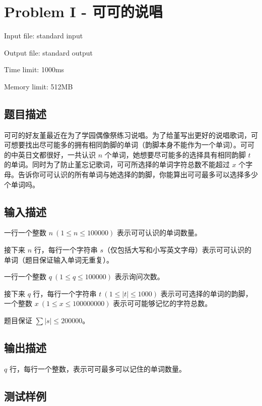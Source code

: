 \newpage
\section{Problem I - 可可的说唱}
{ \limitfont{}
Input file: standard input \par
Output file: standard output \par
Time limit: 1000ms \par
Memory limit: 512MB \par
}
\subsection*{题目描述}
可可的好友堇最近在为了学园偶像祭练习说唱。为了给堇写出更好的说唱歌词，可可想要找出尽可能多的拥有相同韵脚的单词（韵脚本身不能作为一个单词）。可可的中英日文都很好，一共认识 $n$ 个单词，她想要尽可能多的选择具有相同韵脚 $t$ 的单词。同时为了防止堇忘记歌词，可可所选择的单词字符总数不能超过 $x$ 个字母。告诉你可可认识的所有单词与她选择的韵脚，你能算出可可最多可以选择多少个单词吗。
\subsection*{输入描述}

一行一个整数 $n \ ( 1 \le n \le 100000)$ 表示可可认识的单词数量。

接下来 $n$ 行，每行一个字符串 $s$（仅包括大写和小写英文字母）表示可可认识的单词（题目保证输入单词无重复）。

一行一个整数 $q \ (1 \le q \le 100000)$ 表示询问次数。

接下来 $q$ 行，每行一个字符串 $t \ ( 1 \le |t| \le 1000)$ 表示可可选择的单词的韵脚，一个整数 $x \ (1 \le x \le 100000000)$ 表示可可能够记忆的字符总数。

题目保证 $\sum |s| \le 200000$。

\subsection*{输出描述}

$q$ 行，每行一个整数，表示可可最多可以记住的单词数量。

\subsection*{测试样例}

